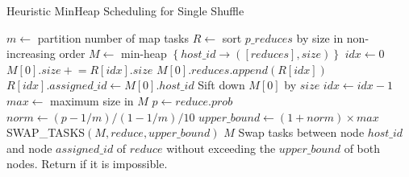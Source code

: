 \noindent
\begin{minipage}{0.95\columnwidth}
\begin{algorithm}[H]
\begin{multicols}{2}
\caption{Heuristic MinHeap Scheduling for Single Shuffle}
\label{hminheap}
	\begin{algorithmic}[1]
	\small
		\State $m\gets$ partition number of map tasks
		\State $R\gets$ sort $p\_reduces$ by size in non-increasing order
		\State $M\gets$ min-heap $\left\{ host\_id \rightarrow \left( \left[ reduces \right], size \right) \right\}$
		\State $idx\gets 0$
		\State{}
			\State $M\left[0\right].size \mathrel{+}= R\left[idx\right].size$
			\State $M\left[0\right].reduces.append\left(R\left[idx\right]\right)$
			\State $R\left[idx\right].assigned\_id \gets M \left[0\right].host\_id$
			\State Sift down $M\left[0\right]$ by $size$
			\State $idx\gets idx-1$
		\EndWhile
		\State $max\gets$ maximum size in $M$
				\State $p\gets reduce.prob$
				\State $norm\gets \left(p-1/m\right)/\left(1-1/m\right)/10$
				\State $upper\_bound \gets \left(1 + norm\right) \times max$
				\State SWAP\_TASKS$\left(M, reduce, upper\_bound\right)$
			\EndIf
		\EndFor
		\Return $M$
	\EndProcedure
		\State Swap tasks between node $host\_id$ and node $assigned\_id$
		\State of $reduce$ without exceeding the $upper\_bound$
		\State of both nodes.
		\State Return if it is impossible.
	\EndProcedure
	\end{algorithmic}
\end{multicols}
\end{algorithm}
\end{minipage}

